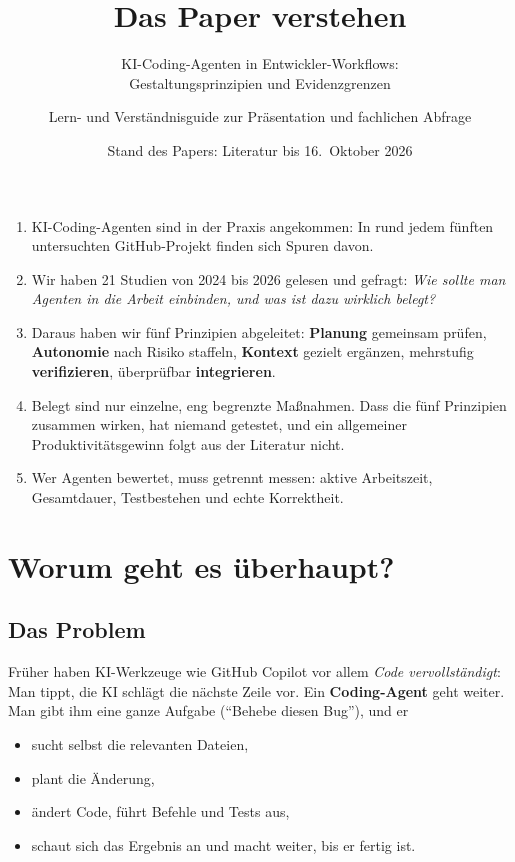 \documentclass[11pt,a4paper,parskip=half]{scrartcl}
\title{Das Paper verstehen}
\subtitle{KI-Coding-Agenten in Entwickler-Workflows:\\Gestaltungsprinzipien und Evidenzgrenzen}
\author{Lern- und Verständnisguide zur Präsentation und fachlichen Abfrage}
\date{Stand des Papers: Literatur bis 16.~Oktober 2026}
\begin{document}
\maketitle
\thispagestyle{empty}

\begin{kernbox}
\begin{enumerate}[leftmargin=*]
\item KI-Coding-Agenten sind in der Praxis angekommen: In rund jedem fünften untersuchten GitHub-Projekt finden sich Spuren davon.
\item Wir haben 21 Studien von 2024 bis 2026 gelesen und gefragt: \emph{Wie sollte man Agenten in die Arbeit einbinden, und was ist dazu wirklich belegt?}
\item Daraus haben wir fünf Prinzipien abgeleitet: \textbf{Planung} gemeinsam prüfen, \textbf{Autonomie} nach Risiko staffeln, \textbf{Kontext} gezielt ergänzen, mehrstufig \textbf{verifizieren}, überprüfbar \textbf{integrieren}.
\item Belegt sind nur einzelne, eng begrenzte Maßnahmen. Dass die fünf Prinzipien zusammen wirken, hat niemand getestet, und ein allgemeiner Produktivitätsgewinn folgt aus der Literatur nicht.
\item Wer Agenten bewertet, muss getrennt messen: aktive Arbeitszeit, Gesamtdauer, Testbestehen und echte Korrektheit.
\end{enumerate}
\end{kernbox}

\tableofcontents
\newpage

\section{Worum geht es überhaupt?}

\subsection{Das Problem}
Früher haben KI-Werkzeuge wie GitHub Copilot vor allem \emph{Code vervollständigt}: Man tippt, die KI schlägt die nächste Zeile vor. Ein \textbf{Coding-Agent} geht weiter. Man gibt ihm eine ganze Aufgabe (\enquote{Behebe diesen Bug}), und er
\begin{itemize}
\item sucht selbst die relevanten Dateien,
\item plant die Änderung,
\item ändert Code, führt Befehle und Tests aus,
\item schaut sich das Ergebnis an und macht weiter, bis er fertig ist.
\end{itemize}
\end{document}
